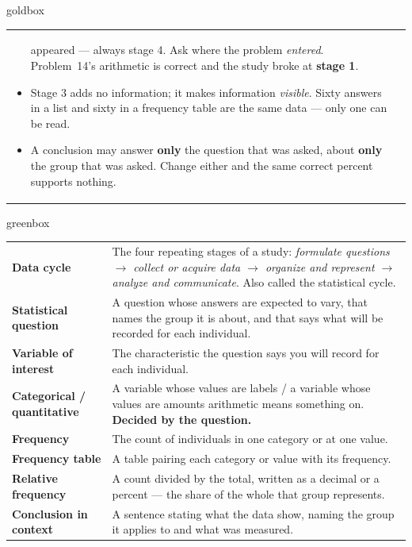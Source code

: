 \documentclass[10pt]{article}
\begin{document}
\begin{skillbox}{goldbox}
\begin{tabularx}{\linewidth}{@{}X|X@{}}
\begin{itemize}[leftmargin=1.1em, nosep, after=\vspace{2pt}]
        appeared --- always stage 4. Ask where the problem \emph{entered}. Problem~14's
        arithmetic is correct and the study broke at \textbf{stage 1}.
  \item Stage 3 adds no information; it makes information \emph{visible}. Sixty answers in a
        list and sixty in a frequency table are the same data --- only one can be read.
  \item A conclusion may answer \textbf{only} the question that was asked, about
        \textbf{only} the group that was asked. Change either and the same correct percent
        supports nothing.
\end{itemize}
\end{tabularx}
\end{skillbox}

\boxguard[24]
\begin{skillbox}{greenbox}
\small
\renewcommand{\arraystretch}{1.35}
\begin{tabularx}{\linewidth}{@{} >{\bfseries}p{3.1cm} X @{}}
Data cycle & The four repeating stages of a study: \emph{formulate questions $\rightarrow$
       collect or acquire data $\rightarrow$ organize and represent $\rightarrow$ analyze and
       communicate}. Also called the statistical cycle. \\
Statistical question & A question whose answers are expected to vary, that names the group it
       is about, and that says what will be recorded for each individual. \\
Variable of interest & The characteristic the question says you will record for each
       individual. \\
Categorical / quantitative & A variable whose values are labels / a variable whose values are
       amounts arithmetic means something on. \textbf{Decided by the question.} \\
Frequency & The count of individuals in one category or at one value. \\
Frequency table & A table pairing each category or value with its frequency. \\
Relative frequency & A count divided by the total, written as a decimal or a percent --- the
       share of the whole that group represents. \\
Conclusion in context & A sentence stating what the data show, naming the group it applies to
       and what was measured. \\
\end{tabularx}
\end{skillbox}
\end{document}
